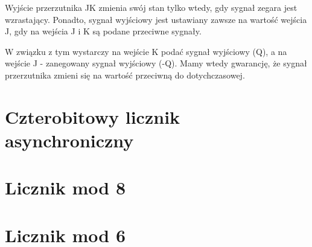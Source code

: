 \documentclass[12pt,a4paper]{article}
\begin{document}
Wyjście przerzutnika JK zmienia swój stan tylko wtedy, gdy sygnał zegara jest wzrastający. Ponadto, sygnał wyjściowy jest ustawiany zawsze na wartość wejścia J, gdy na wejścia J i K są podane przeciwne sygnały. 

W związku z tym wystarczy na wejście K podać sygnał wyjściowy (Q), a na wejście J - zanegowany sygnał wyjściowy (-Q). Mamy wtedy gwarancję, że sygnał przerzutnika zmieni się na wartość przeciwną do dotychczasowej.

\section{Czterobitowy licznik asynchroniczny}

\section{Licznik mod 8}

\section{Licznik mod 6}
\end{document}
